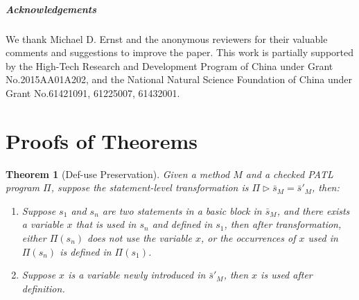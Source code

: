 \documentclass[letterpaper, USenglish]{lipics-v2016}
\newcommand{\PATL}{PATL\xspace}
\theoremstyle{plain}
\begin{document}
\subparagraph*{Acknowledgements}

We thank Michael D. Ernst and the anonymous reviewers for their valuable comments and suggestions to improve the paper. This work is partially supported by the High-Tech Research and Development Program of China under Grant No.2015AA01A202, and the National Natural Science Foundation of China under Grant No.61421091, 61225007, 61432001.



%
{}



\newpage
\appendix

\newtheorem*{thm}{Theorem}
\newtheorem*{prop}{Property}

\section{Proofs of Theorems}

\begin{thm}[Def-use Preservation] Given a method $M$ and a checked \PATL program $\Pi$, suppose the statement-level transformation is $\Pi\triangleright \bar{s}_M=\bar{s}'_{M}$, then:
  \begin{enumerate}
    \item Suppose $s_1$ and $s_n$ are two statements in a basic block in $\bar{s}_M$, and there exists a variable $x$ that is used in $s_n$ and defined in $s_1$, then after transformation, either $\Pi(s_n)$ does not use the variable $x$, or the occurrences of $x$ used in $\Pi(s_n)$ is defined in $\Pi(s_1)$. 
    \item Suppose $x$ is a variable newly introduced in $\bar{s}'_M$, then $x$ is used after definition.
  \end{enumerate}
\end{thm}
\end{document}
